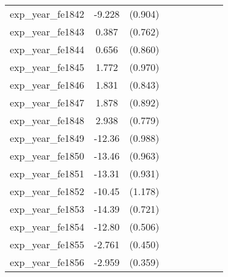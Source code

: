 {\begin{tabular}{l*{4}{cc}}
exp\_year\_fe1842&   -9.228\sym{***}&  (0.904)&                  &         &                  &         &                  &         \\
exp\_year\_fe1843&    0.387         &  (0.762)&                  &         &                  &         &                  &         \\
exp\_year\_fe1844&    0.656         &  (0.860)&                  &         &                  &         &                  &         \\
exp\_year\_fe1845&    1.772         &  (0.970)&                  &         &                  &         &                  &         \\
exp\_year\_fe1846&    1.831\sym{*}  &  (0.843)&                  &         &                  &         &                  &         \\
exp\_year\_fe1847&    1.878\sym{*}  &  (0.892)&                  &         &                  &         &                  &         \\
exp\_year\_fe1848&    2.938\sym{***}&  (0.779)&                  &         &                  &         &                  &         \\
exp\_year\_fe1849&   -12.36\sym{***}&  (0.988)&                  &         &                  &         &                  &         \\
exp\_year\_fe1850&   -13.46\sym{***}&  (0.963)&                  &         &                  &         &                  &         \\
exp\_year\_fe1851&   -13.31\sym{***}&  (0.931)&                  &         &                  &         &                  &         \\
exp\_year\_fe1852&   -10.45\sym{***}&  (1.178)&                  &         &                  &         &                  &         \\
exp\_year\_fe1853&   -14.39\sym{***}&  (0.721)&                  &         &                  &         &                  &         \\
exp\_year\_fe1854&   -12.80\sym{***}&  (0.506)&                  &         &                  &         &                  &         \\
exp\_year\_fe1855&   -2.761\sym{***}&  (0.450)&                  &         &                  &         &                  &         \\
exp\_year\_fe1856&   -2.959\sym{***}&  (0.359)&                  &         &                  &         &                  &         \\

\end{tabular}}
